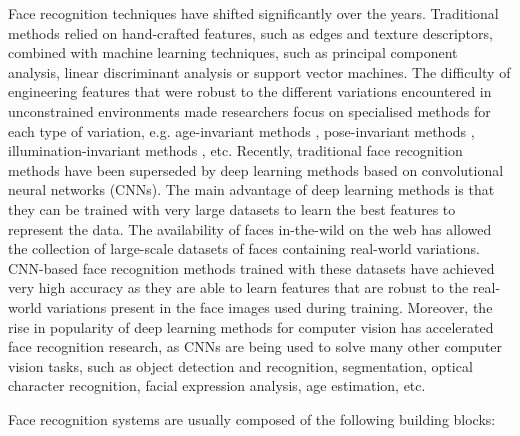 \documentclass[conference]{IEEEtran}
\begin{document}
Face recognition techniques have shifted significantly over the years. Traditional methods relied on hand-crafted features, such as edges and texture descriptors, combined with machine learning techniques, such as principal component analysis, linear discriminant analysis or support vector machines. The difficulty of engineering features that were robust to the different variations encountered in unconstrained environments made researchers focus on specialised methods for each type of variation, e.g. age-invariant methods \cite{park2010age,li2011discriminative}, pose-invariant methods \cite{ding2016comprehensive}, illumination-invariant methods \cite{liu2005illumination,tan2010enhanced}, etc. Recently, traditional face recognition methods have been superseded by deep learning methods based on convolutional neural networks (CNNs). The main advantage of deep learning methods is that they can be trained with very large datasets to learn the best features to represent the data. The availability of faces in-the-wild on the web has allowed the collection of large-scale datasets of faces \cite{sun2014deep,yi2014learning,parkhi2015deep,guo2016ms,nech2017level,bansal2017umdfaces,cao2017vggface2} containing real-world variations. CNN-based face recognition methods trained with these datasets have achieved very high accuracy as they are able to learn features that are robust to the real-world variations present in the face images used during training. Moreover, the rise in popularity of deep learning methods for computer vision has accelerated face recognition research, as CNNs are being used to solve many other computer vision tasks, such as object detection and recognition, segmentation, optical character recognition, facial expression analysis, age estimation, etc.

Face recognition systems are usually composed of the following building blocks:
\end{document}
